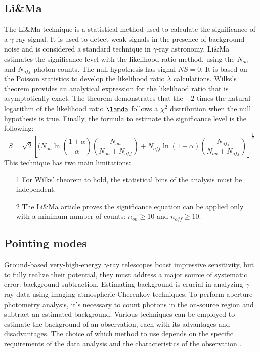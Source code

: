 \subsection{Li\&Ma}
\label{ss:li-ma}
The Li\&Ma technique is a statistical method used to calculate the significance of a $\gamma$-ray signal. It is used to detect weak signals in the presence of background noise and is considered a standard technique in $\gamma$-ray astronomy. Li\&Ma estimates the significance level with the likelihood ratio method, using the $N_{on}$ and $N_{off}$ photon counts. The null hypothesis has signal $NS = 0$. It is based on the Poisson statistics to develop the likelihood ratio $\lambda$ calculations. Wilks's theorem \cite{wilks_1938} provides an analytical expression for the likelihood ratio that is asymptotically exact. The theorem demonstrates that the $-2$ times the natural logarithm of the likelihood ratio $\lamda$ follows a $\chi^2$ distribution when the null hypothesis is true. Finally, the formula to estimate the significance level is the following: 
$$S = \sqrt{2}{[(N_{on}\ln{(\frac{1+\alpha}{\alpha})(\frac{N_{on}}{N_{on}+N_{off}})} + N_{off}\ln{(1+\alpha)(\frac{N_{off}}{N_{on}+N_{off}})}] }^{\frac{1}{2}}$$
This technique has two main limitations:
\begin{enumerate}
    \item[1] For Wilks' theorem to hold, the statistical bins of the analysis must be independent.
    \item[2] The Li\&Ma article \cite{Lima_1983} proves the significance equation can be applied only with a minimum number of counts: $n_{on} \geq 10$ and $ n_{off} \geq 10$. 
\end{enumerate}


\subsection{Pointing modes}
\label{ss:pointing-modes}
Ground-based very-high-energy $\gamma$-ray telescopes boast impressive sensitivity, but to fully realize their potential, they must address a major source of systematic error: background subtraction. Estimating background is crucial in analyzing $\gamma$-ray data using imaging atmospheric Cherenkov techniques. To perform aperture photometry analysis, it's necessary to count photons in the on-source region and subtract an estimated background. Various techniques can be employed to estimate the background of an observation, each with its advantages and disadvantages. The choice of which method to use depends on the specific requirements of the data analysis and the characteristics of the observation \cite{Berge_2007}. 

